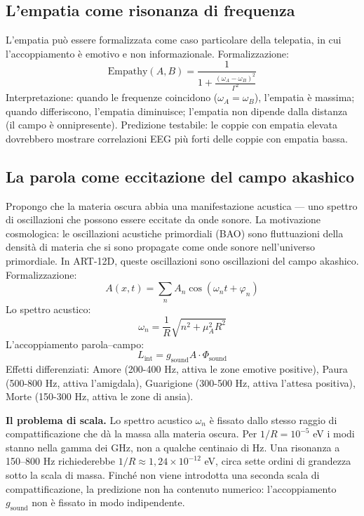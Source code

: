 \documentclass[11pt,a4paper]{article}
\begin{document}
\subsection{L'empatia come risonanza di frequenza}
L'empatia può essere formalizzata come caso particolare della telepatia, in cui l'accoppiamento è emotivo e non informazionale. Formalizzazione:
\begin{equation}
\text{Empathy}(A,B) = \frac{1}{1 + \frac{(\omega_A - \omega_B)^2}{\Gamma^2}}
\end{equation}
Interpretazione: quando le frequenze coincidono ($\omega_A = \omega_B$), l'empatia è massima; quando differiscono, l'empatia diminuisce; l'empatia non dipende dalla distanza (il campo è onnipresente). Predizione testabile: le coppie con empatia elevata dovrebbero mostrare correlazioni EEG più forti delle coppie con empatia bassa.

\subsection{La parola come eccitazione del campo akashico}
Propongo che la materia oscura abbia una manifestazione acustica --- uno spettro di oscillazioni che possono essere eccitate da onde sonore. La motivazione cosmologica: le oscillazioni acustiche primordiali (BAO) sono fluttuazioni della densità di materia che si sono propagate come onde sonore nell'universo primordiale. In ART-12D, queste oscillazioni sono oscillazioni del campo akashico. Formalizzazione:
\begin{equation}
A(x,t) = \sum_n A_n \cos(\omega_n t + \varphi_n)
\end{equation}
Lo spettro acustico:
\begin{equation}
\omega_n = \frac{1}{R} \sqrt{n^2 + \mu_A^2 R^2}
\end{equation}
L'accoppiamento parola--campo:
\begin{equation}
L_{\text{int}} = g_{\text{sound}} A \cdot \Phi_{\text{sound}}
\end{equation}
Effetti differenziati: Amore (200-400 Hz, attiva le zone emotive positive), Paura (500-800 Hz, attiva l'amigdala), Guarigione (300-500 Hz, attiva l'attesa positiva), Morte (150-300 Hz, attiva le zone di ansia).

\textbf{Il problema di scala.} Lo spettro acustico $\omega_n$ è fissato dallo stesso raggio di compattificazione che dà la massa alla materia oscura. Per $1/R = 10^{-5}$ eV i modi stanno nella gamma dei GHz, non a qualche centinaio di Hz. Una risonanza a 150--800 Hz richiederebbe $1/R \approx 1,24\times10^{-12}$ eV, circa sette ordini di grandezza sotto la scala di massa. Finché non viene introdotta una seconda scala di compattificazione, la predizione non ha contenuto numerico: l'accoppiamento $g_{\text{sound}}$ non è fissato in modo indipendente.
\end{document}
